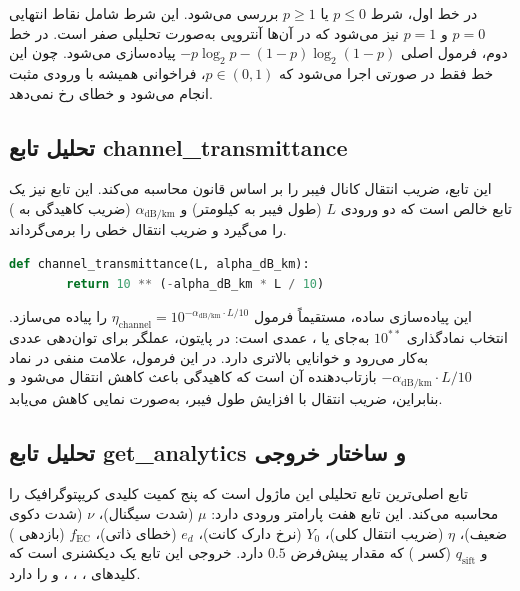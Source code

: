 در خط اول، شرط $p \leq 0$ یا $p \geq 1$ بررسی می‌شود. این شرط شامل نقاط انتهایی $p = 0$ و $p = 1$ نیز می‌شود که در آن‌ها آنتروپی به‌صورت تحلیلی صفر است. در خط دوم، فرمول اصلی $-p \log_2 p - (1-p) \log_2(1-p)$ پیاده‌سازی می‌شود. چون این خط فقط در صورتی اجرا می‌شود که $p \in (0, 1)$، فراخوانی  همیشه با ورودی مثبت انجام می‌شود و خطای  رخ نمی‌دهد.

\subsection{تحلیل تابع channel\_transmittance}

این تابع، ضریب انتقال کانال فیبر را بر اساس قانون  محاسبه می‌کند. این تابع نیز یک تابع خالص است که دو ورودی $L$ (طول فیبر به کیلومتر) و $\alpha_{\text{dB/km}}$ (ضریب کاهیدگی به ) را می‌گیرد و ضریب انتقال خطی را برمی‌گرداند.

\begin{LTR}
	\begin{lstlisting}[language=Python]
		def channel_transmittance(L, alpha_dB_km):
		return 10 ** (-alpha_dB_km * L / 10)
	\end{lstlisting}
\end{LTR}

این پیاده‌سازی ساده، مستقیماً فرمول $\eta_{\text{channel}} = 10^{-\alpha_{\text{dB/km}} \cdot L / 10}$ را پیاده می‌سازد. انتخاب نمادگذاری $10^{**}$ به‌جای  یا ، عمدی است: در پایتون، عملگر \lr{**} برای توان‌دهی عددی به‌کار می‌رود و خوانایی بالاتری دارد. در این فرمول، علامت منفی در نماد $-\alpha_{\text{dB/km}} \cdot L / 10$ بازتاب‌دهنده آن است که کاهیدگی باعث کاهش انتقال می‌شود و بنابراین، ضریب انتقال با افزایش طول فیبر، به‌صورت نمایی کاهش می‌یابد.

\subsection{تحلیل تابع get\_analytics و ساختار خروجی}

تابع  اصلی‌ترین تابع تحلیلی این ماژول است که پنج کمیت کلیدی کریپتوگرافیک را محاسبه می‌کند. این تابع هفت پارامتر ورودی دارد: $\mu$ (شدت سیگنال)، $\nu$ (شدت دکوی ضعیف)، $\eta$ (ضریب انتقال کلی)، $Y_0$ (نرخ دارک کانت)، $e_d$ (خطای ذاتی)، $f_{\text{EC}}$ (بازدهی ) و $q_{\text{sift}}$ (کسر ) که مقدار پیش‌فرض $0.5$ دارد. خروجی این تابع یک دیکشنری است که کلیدهای ، ، ،  و  را دارد.

